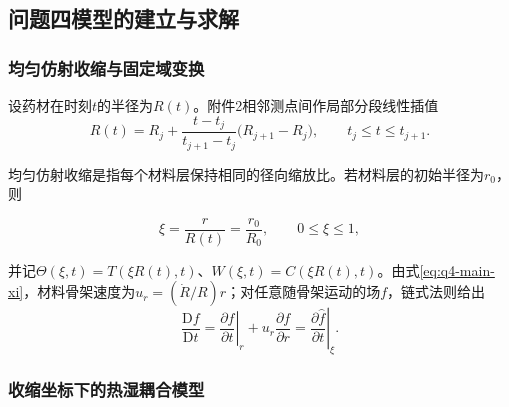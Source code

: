 \documentclass[withoutpreface,bwprint]{cumcmthesis}
\begin{document}
\subsection{问题四模型的建立与求解}

\subsubsection{均匀仿射收缩与固定域变换}

设药材在时刻$t$的半径为$R(t)$。附件2相邻测点间作局部分段线性插值
\begin{equation}
R(t)=R_j+\frac{t-t_j}{t_{j+1}-t_j}\bigl(R_{j+1}-R_j\bigr),
\qquad t_j\le t\le t_{j+1}.
\label{eq:q4-main-radius}
\end{equation}

均匀仿射收缩是指每个材料层保持相同的径向缩放比。若材料层的初始半径为$r_0$，则

\begin{equation}
\xi=\frac{r}{R(t)}=\frac{r_0}{R_0},
\qquad 0\le\xi\le1,
\label{eq:q4-main-xi}
\end{equation}

并记$\Theta(\xi,t)=T(\xi R(t),t)$、$W(\xi,t)=C(\xi R(t),t)$。由式\eqref{eq:q4-main-xi}，材料骨架速度为$u_r=(\dot R/R)r$；对任意随骨架运动的场$f$，链式法则给出
\begin{equation}
\frac{\mathrm Df}{\mathrm Dt}
=\left.\frac{\partial f}{\partial t}\right|_r
+u_r\frac{\partial f}{\partial r}
=\left.\frac{\partial \widehat f}{\partial t}\right|_\xi.
\label{eq:q4-main-material-derivative}
\end{equation}

\subsubsection{收缩坐标下的热湿耦合模型}
\end{document}
